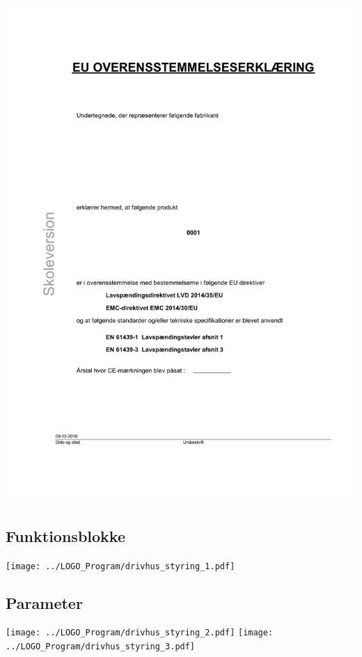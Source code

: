 \includegraphics[scale=0.72]{appendix/Drivhus_panel_13.pdf}
\subsection{Funktionsblokke}
\texttt{[image: ../LOGO\_Program/drivhus\_styring\_1.pdf]}
\subsection{Parameter}
\texttt{[image: ../LOGO\_Program/drivhus\_styring\_2.pdf]}
\newpage
\texttt{[image: ../LOGO\_Program/drivhus\_styring\_3.pdf]}
%